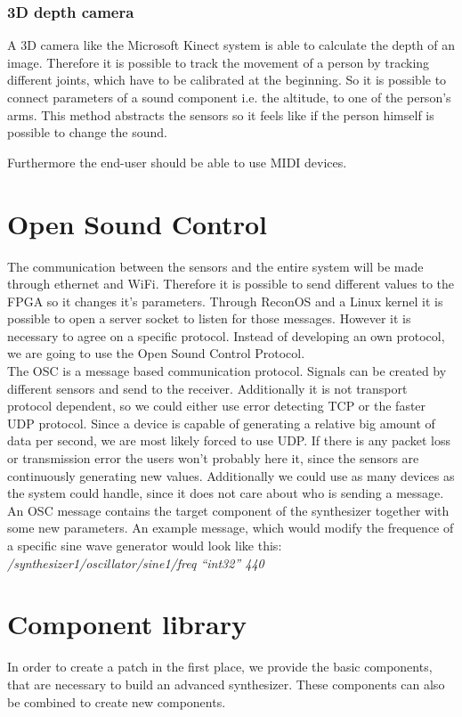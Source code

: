 \subsubsection{3D depth camera}
A 3D camera like the Microsoft Kinect system is able to calculate the depth of an image. Therefore it is possible to track the movement of a person by tracking different joints, which have to be calibrated at the beginning. So it is possible to connect parameters of a sound component i.e. the altitude, to one of the person's arms. This method abstracts the sensors so it feels like if the person himself is possible to change the sound.

Furthermore the end-user should be able to use MIDI devices.

\section{Open Sound Control}
The communication between the sensors and the entire system will be made through ethernet and WiFi. Therefore it is possible to send different values to the \ac{FPGA} so it changes it's parameters. Through ReconOS and a Linux kernel it is possible to open a server socket to listen for those messages. However it is necessary to agree on a specific protocol. Instead of developing an own protocol, we are going to use the Open Sound Control Protocol. \\
The \ac{OSC} is a message based communication protocol. Signals can be created by different sensors and send to the receiver. Additionally it is not transport protocol dependent, so we could either use error detecting TCP or the faster UDP protocol. Since a device is capable of generating a relative big amount of data per second, we are most likely forced to use UDP. If there is any packet loss or transmission error the users won't probably here it, since the sensors are continuously generating new values. Additionally we could use as many devices as the system could handle, since it does not care about who is sending a message. \\
An \ac{OSC} message contains the target component of the synthesizer together with some new parameters. An example message, which would modify the frequence of a specific sine wave generator would look like this: \\
\emph{/synthesizer1/oscillator/sine1/freq “int32” 440} \\


\section{Component library}
In order to create a patch in the first place, we provide the basic components, that are necessary to build an advanced synthesizer. These components can also be combined to create new components.


